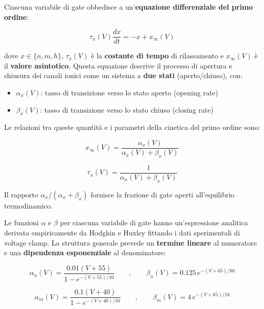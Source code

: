 Ciascuna variabile di gate obbedisce a un'\textbf{equazione differenziale del primo ordine}:

\begin{equation}
\tau_x(V) \frac{dx}{dt} = -x + x_\infty(V)
\end{equation}

dove $x \in \{n, m, h\}$, $\tau_x(V)$ è la \textbf{costante di tempo} di rilassamento  e $x_\infty(V)$ è il \textbf{valore asintotico}. Questa equazione descrive il processo di apertura e chiusura dei canali ionici come un sistema a \textbf{due stati} (aperto/chiuso), con:

\begin{itemize}
    \item $\alpha_x(V)$: tasso di transizione verso lo stato aperto (opening rate)
    \item $\beta_x(V)$: tasso di transizione verso lo stato chiuso (closing rate)
\end{itemize}

Le relazioni tra queste quantità e i parametri della cinetica del primo ordine sono:

\begin{equation}
x_\infty(V) = \frac{\alpha_x(V)}{\alpha_x(V) + \beta_x(V)}
\end{equation}

\begin{equation}
\tau_x(V) = \frac{1}{\alpha_x(V) + \beta_x(V)}
\end{equation}

\begin{tcolorbox}[colback=gray!5, colframe=gray!40, arc=2mm, boxrule=0.5pt]
Il rapporto $\alpha_x / (\alpha_x + \beta_x)$ fornisce la frazione di gate aperti all'equilibrio termodinamico.
\end{tcolorbox}


Le funzioni $\alpha$ e $\beta$ per ciascuna variabile di gate hanno un'espressione analitica derivata empiricamente da Hodgkin e Huxley fittando i dati sperimentali di voltage clamp. La struttura generale prevede un \textbf{termine lineare} al numeratore e una \textbf{dipendenza esponenziale} al denominatore:

\begin{equation}
\alpha_n(V) = \frac{0.01(V + 55)}{1 - e^{-(V+55)/10}}
\quad \quad  ,  \quad \quad
\beta_n(V) = 0.125 \, e^{-(V+65)/80}
\end{equation}

\begin{equation}
\alpha_m(V) = \frac{0.1(V + 40)}{1 - e^{-(V+40)/10}}
\quad \quad  ,  \quad \quad
\beta_m(V) = 4 \, e^{-(V+65)/18}
\end{equation}

